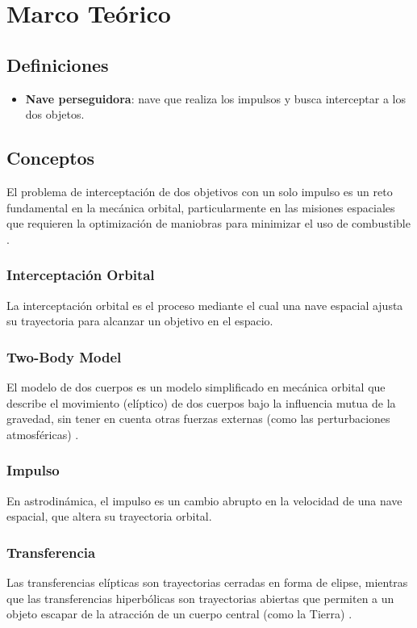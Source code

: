 \section{Marco Teórico}
\subsection{Definiciones}
\begin{itemize}
    \item \textbf{Nave perseguidora}: nave que realiza los impulsos y busca interceptar a los dos objetos.
\end{itemize}

\subsection{Conceptos}
El problema de interceptación de dos objetivos con un solo impulso es un reto
fundamental en la mecánica orbital, particularmente en las misiones espaciales
que requieren la optimización de maniobras para minimizar el uso de combustible
\parencite{Battin1999}.
\subsubsection{Interceptación Orbital}
La interceptación orbital es el proceso mediante el cual una nave espacial
ajusta su trayectoria para alcanzar un objetivo en el espacio.
\subsubsection{Two-Body Model}
El modelo de dos cuerpos es un modelo simplificado en mecánica orbital que
describe el movimiento (elíptico) de dos cuerpos bajo la influencia mutua de la
gravedad, sin tener en cuenta otras fuerzas externas (como las perturbaciones
atmosféricas) \parencite{Cerf2013}.
\subsubsection{Impulso}
En astrodinámica, el impulso es un cambio abrupto en la velocidad de una nave
espacial, que altera su trayectoria orbital.
\subsubsection{Transferencia}
Las transferencias elípticas son trayectorias cerradas en forma de elipse,
mientras que las transferencias hiperbólicas son trayectorias abiertas que
permiten a un objeto escapar de la atracción de un cuerpo central (como la
Tierra) \parencite{ZHU20162177}.
